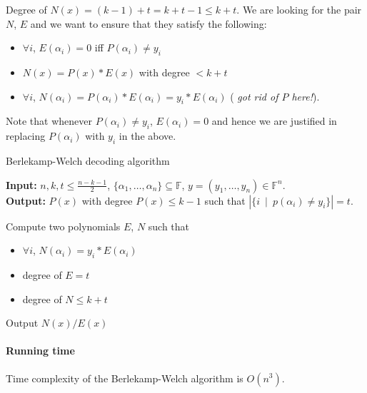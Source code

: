 Degree of $N(x)=(k-1)+t=k+t-1\leq k+t$. We are looking for the pair $N$, $E$ and we want to ensure that they satisfy the following:

\begin{itemize}
\item $\forall i$, $E(\alpha_{i})=0$ iff $P(\alpha_{i})\neq y_{i}$
\item $N(x)=P(x)*E(x)$ with degree $<k+t$
\item $\forall i$, $N(\alpha_{i})=P(\alpha_{i})*E(\alpha_{i})= y_{i}*E(\alpha_{i})$ ({\em \color{red} got rid of $P$ here!}).
\end{itemize}

 Note that whenever  $P(\alpha_{i})\neq y_{i}$, $E(\alpha_{i})=0$ and hence we are justified in  replacing  $P(\alpha_i)$ with $y_i$ in the above. 

\begin{algorithm}
\label{alg:Berlekamp-Welch}
\caption{Berlekamp-Welch decoding algorithm}
{\bf Input:} $n,k, t\le \frac{n-k-1}{2}$, $\{\alpha_1,\ldots, \alpha_n\}\subseteq {\mathbb F}$, $y=(y_1,\ldots, y_n)\in {\mathbb F}^n$. \\
{\bf Output: } $P(x)$ with degree $P(x) \le k-1$ such that $|\{i~\mid~p(\alpha_i)\neq y_i\}| =t$.
\begin{algorithmic}[1]
\State Compute two polynomials   $E$, $N$ such that
\begin{itemize}
\item $\forall i$, $N(\alpha_{i})=y_{i}*E(\alpha_{i})$
\item degree of $E=t$
\item degree of $N\leq k+t$
\end{itemize}
\State Output $N(x)/E(x)$
\end{algorithmic}
\end{algorithm}


\paragraph{Running time}

\begin{lemma}
 Time complexity of the Berlekamp-Welch  algorithm is $O(n^{3})$.
\end{lemma}

